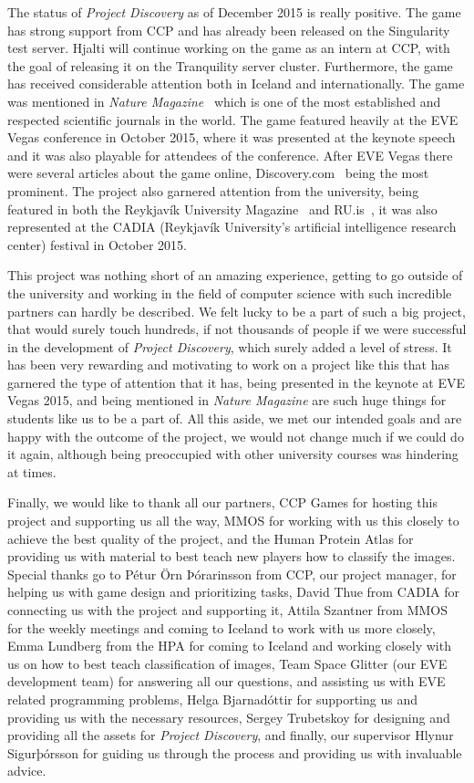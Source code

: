 The status of \emph{Project Discovery} as of December 2015 is really positive. The game has strong support from CCP and has already been released on the Singularity test server. Hjalti will continue working on the game as an intern at CCP, with the goal of releasing it on the Tranquility server cluster. Furthermore, the game has received considerable attention both in Iceland and internationally. The game was mentioned in \emph{Nature Magazine}~\cite{nature} which is one of the most established and respected scientific journals in the world. The game featured heavily at the EVE Vegas conference in October 2015, where it was presented at the keynote speech and it was also playable for attendees of the conference. After EVE Vegas there were several articles about the game online, Discovery.com~\cite{discovery} being the most prominent. The project also garnered attention from the university, being featured in both the Reykjavík University Magazine~\cite{rumag} and RU.is~\cite{ruis}, it was also represented at the CADIA (Reykjavík University's artificial intelligence research center) festival in October 2015. 

This project was nothing short of an amazing experience, getting to go outside of the university and working in the field of computer science with such incredible partners can hardly be described. We felt lucky to be a part of such a big project, that would surely touch hundreds, if not thousands of people if we were successful in the development of \emph{Project Discovery}, which surely added a level of stress. It has been very rewarding and motivating to work on a project like this that has garnered the type of attention that it has, being presented in the keynote at EVE Vegas 2015, and being mentioned in \emph{Nature Magazine} are such huge things for students like us to be a part of. All this aside, we met our intended goals and are happy with the outcome of the project, we would not change much if we could do it again, although being preoccupied with other university courses was hindering at times.

Finally, we would like to thank all our partners, CCP Games for hosting this project and supporting us all the way, MMOS for working with us this closely to achieve the best quality of the project, and the Human Protein Atlas for providing us with material to best teach new players how to classify the images. Special thanks go to Pétur Örn Þórarinsson from CCP, our project manager, for helping us with game design and prioritizing tasks, David Thue from CADIA for connecting us with the project and supporting it, Attila Szantner from MMOS for the weekly meetings and coming to Iceland to work with us more closely, Emma Lundberg from the HPA for coming to Iceland and working closely with us on how to best teach classification of images, Team Space Glitter (our EVE development team) for answering all our questions, and assisting us with EVE related programming problems, Helga Bjarnadóttir for supporting us and providing us with the necessary resources, Sergey Trubetskoy for designing and providing all the assets for \emph{Project Discovery}, and finally, our supervisor Hlynur Sigurþórsson for guiding us through the process and providing us with invaluable advice. 


